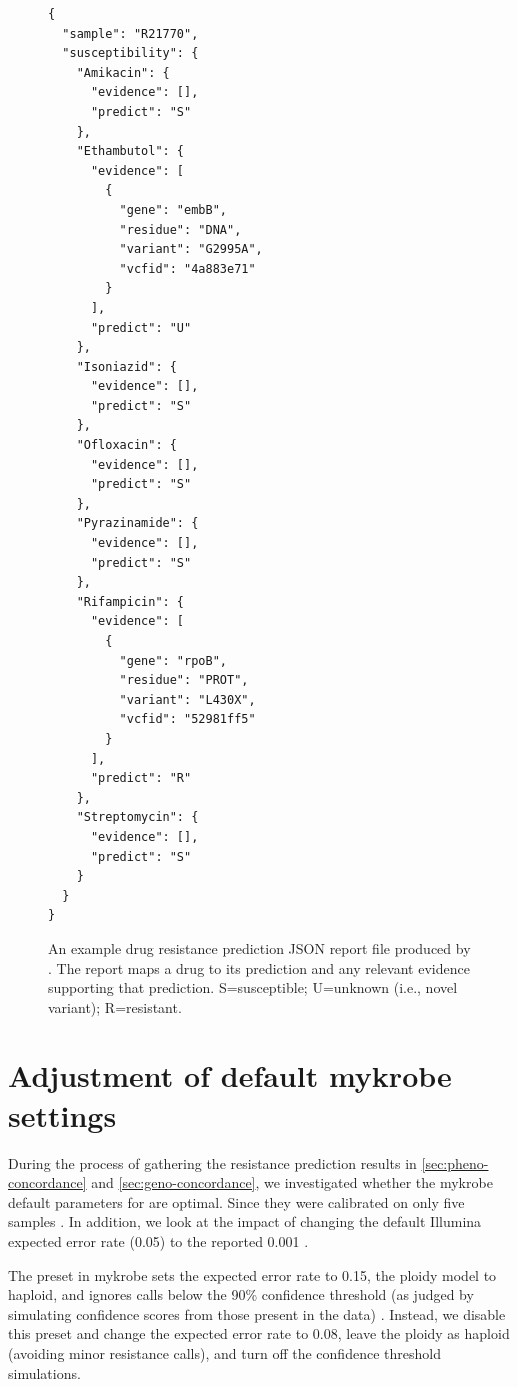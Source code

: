 \begin{figure}
\begin{verbatim}
{
  "sample": "R21770",
  "susceptibility": {
    "Amikacin": {
      "evidence": [],
      "predict": "S"
    },
    "Ethambutol": {
      "evidence": [
        {
          "gene": "embB",
          "residue": "DNA",
          "variant": "G2995A",
          "vcfid": "4a883e71"
        }
      ],
      "predict": "U"
    },
    "Isoniazid": {
      "evidence": [],
      "predict": "S"
    },
    "Ofloxacin": {
      "evidence": [],
      "predict": "S"
    },
    "Pyrazinamide": {
      "evidence": [],
      "predict": "S"
    },
    "Rifampicin": {
      "evidence": [
        {
          "gene": "rpoB",
          "residue": "PROT",
          "variant": "L430X",
          "vcfid": "52981ff5"
        }
      ],
      "predict": "R"
    },
    "Streptomycin": {
      "evidence": [],
      "predict": "S"
    }
  }
}
\end{verbatim}
\caption{An example drug resistance prediction JSON report file produced by \drprg{}. The report maps a drug to its prediction and any relevant evidence supporting that prediction. S=susceptible; U=unknown (i.e., novel variant); R=resistant.}
\label{fig:example-drprg-report}
\end{figure}

\section{Adjustment of default mykrobe \ont{} settings}
\label{app:mykrobe-settings}

During the process of gathering the resistance prediction results in \autoref{sec:pheno-concordance} and \autoref{sec:geno-concordance}, we investigated whether the mykrobe default parameters for \ont{} are optimal. Since they were calibrated on only five samples \cite{hunt2019}. In addition, we look at the impact of changing the default Illumina expected error rate (0.05) to the reported 0.001 \cite{manley2016}.

The \ont{} preset in mykrobe sets the expected error rate to 0.15, the ploidy model to haploid, and ignores calls below the 90\% confidence threshold (as judged by simulating confidence scores from those present in the data) \cite{hunt2019}. Instead, we disable this preset and change the expected error rate to 0.08, leave the ploidy as haploid (avoiding minor resistance calls), and turn off the confidence threshold simulations.

